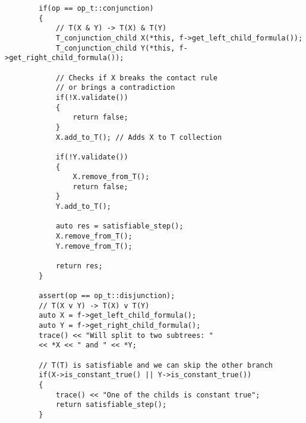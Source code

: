 \documentclass{article}
\begin{document}
\begin{lstlisting}
        if(op == op_t::conjunction)
        {
            // T(X & Y) -> T(X) & T(Y)
            T_conjunction_child X(*this, f->get_left_child_formula());
            T_conjunction_child Y(*this, f->get_right_child_formula());

            // Checks if X breaks the contact rule
            // or brings a contradiction
            if(!X.validate())
            {
                return false;
            }
            X.add_to_T(); // Adds X to T collection

            if(!Y.validate())
            {
                X.remove_from_T();
                return false;
            }
            Y.add_to_T();

            auto res = satisfiable_step();
            X.remove_from_T();
            Y.remove_from_T();

            return res;
        }

        assert(op == op_t::disjunction);
        // T(X v Y) -> T(X) v T(Y)
        auto X = f->get_left_child_formula();
        auto Y = f->get_right_child_formula();
        trace() << "Will split to two subtrees: "
		<< *X << " and " << *Y;

        // T(T) is satisfiable and we can skip the other branch
        if(X->is_constant_true() || Y->is_constant_true())
        {
            trace() << "One of the childs is constant true";
            return satisfiable_step();
        }
\end{lstlisting}
\newpage
\end{document}

